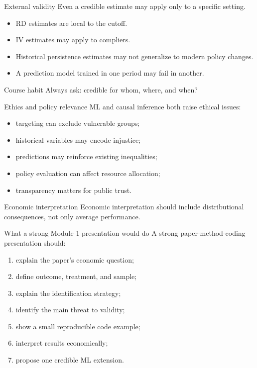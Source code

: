 \documentclass[aspectratio=169,11pt]{beamer}
\newcommand{\econ}[1]{\begin{exampleblock}{Economic interpretation}#1\end{exampleblock}}
\begin{document}
\begin{frame}{External validity}
Even a credible estimate may apply only to a specific setting.
\begin{itemize}
  \item RD estimates are local to the cutoff.
  \item IV estimates may apply to compliers.
  \item Historical persistence estimates may not generalize to modern policy changes.
  \item A prediction model trained in one period may fail in another.
\end{itemize}
\begin{alertblock}{Course habit}
Always ask: credible for whom, where, and when?
\end{alertblock}
\end{frame}

\begin{frame}{Ethics and policy relevance}
ML and causal inference both raise ethical issues:
\begin{itemize}
  \item targeting can exclude vulnerable groups;
  \item historical variables may encode injustice;
  \item predictions may reinforce existing inequalities;
  \item policy evaluation can affect resource allocation;
  \item transparency matters for public trust.
\end{itemize}
\econ{
Economic interpretation should include distributional consequences, not only average performance.
}
\end{frame}

\begin{frame}{What a strong Module 1 presentation would do}
A strong paper-method-coding presentation should:
\begin{enumerate}
  \item explain the paper's economic question;
  \item define outcome, treatment, and sample;
  \item explain the identification strategy;
  \item identify the main threat to validity;
  \item show a small reproducible code example;
  \item interpret results economically;
  \item propose one credible ML extension.
\end{enumerate}
\end{frame}
\end{document}
